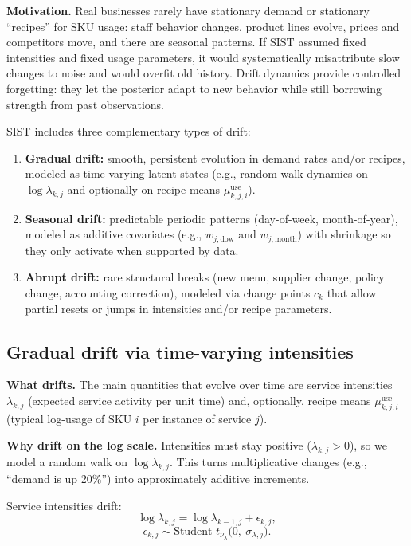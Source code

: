 \documentclass[11pt]{article}
\begin{document}
\textbf{Motivation.} Real businesses rarely have stationary demand or stationary ``recipes'' for SKU usage: staff behavior changes, product lines evolve, prices and competitors move, and there are seasonal patterns.
If SIST assumed fixed intensities and fixed usage parameters, it would systematically misattribute slow changes to noise and would overfit old history.
Drift dynamics provide controlled forgetting: they let the posterior adapt to new behavior while still borrowing strength from past observations.

SIST includes three complementary types of drift:
\begin{enumerate}
  \item \textbf{Gradual drift:} smooth, persistent evolution in demand rates and/or recipes, modeled as time-varying latent states (e.g., random-walk dynamics on $\log \lambda_{k,j}$ and optionally on recipe means $\mu^{\mathrm{use}}_{k,j,i}$).
  \item \textbf{Seasonal drift:} predictable periodic patterns (day-of-week, month-of-year), modeled as additive covariates (e.g., $w_{j,\text{dow}}$ and $w_{j,\text{month}}$) with shrinkage so they only activate when supported by data.
  \item \textbf{Abrupt drift:} rare structural breaks (new menu, supplier change, policy change, accounting correction), modeled via change points $c_k$ that allow partial resets or jumps in intensities and/or recipe parameters.
\end{enumerate}

\subsection{Gradual drift via time-varying intensities}

\textbf{What drifts.} The main quantities that evolve over time are service intensities $\lambda_{k,j}$ (expected service activity per unit time) and, optionally, recipe means $\mu^{\mathrm{use}}_{k,j,i}$ (typical log-usage of SKU $i$ per instance of service $j$).

\textbf{Why drift on the log scale.} Intensities must stay positive ($\lambda_{k,j}>0$), so we model a random walk on $\log \lambda_{k,j}$.
This turns multiplicative changes (e.g., ``demand is up 20\%'') into approximately additive increments.

Service intensities drift:
\[
  \log \lambda_{k,j} = \log \lambda_{k-1,j} + \epsilon_{k,j},
\]
\[
  \epsilon_{k,j} \sim \text{Student-}t_{\nu_{\lambda}}\bigl(0,\ \sigma_{\lambda,j}\bigr).
\]
\end{document}
